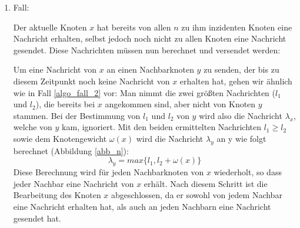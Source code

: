 \begin{enumerate}
		
	\item Fall:
	
		Der aktuelle Knoten $x$ hat bereits von allen $n$ zu ihm inzidenten Knoten eine Nachricht erhalten, selbst jedoch noch nicht zu allen Knoten eine Nachricht gesendet. Diese Nachrichten müssen nun berechnet und versendet werden:\label{labelAufUnterfall}
		
		
			
			
		
		Um eine Nachricht von $x$ an einen Nachbarknoten $y$ zu senden, der bis zu diesem Zeitpunkt noch keine Nachricht von $x$ erhalten hat, gehen wir ähnlich wie in Fall \ref{algo_fall_2} vor: Man nimmt die zwei größten Nachrichten ($l_{1}$ und $l_{2}$), die bereits bei $x$ angekommen sind, aber nicht von Knoten $y$ stammen. Bei der Bestimmung von $l_{1}$ und $l_{2}$ von $y$ wird also die Nachricht $\lambda_{x}$, welche von $y$ kam, ignoriert. Mit den beiden ermittelten Nachrichten $l_{1} \ge l_{2}$ sowie dem Knotengewicht $\omega(x)$ wird die Nachricht $\lambda_{y}$ an y wie folgt berechnet (Abbildung \ref{abb_n}):  $$\lambda_{y} = max\{l_{1},  l_{2} + \omega(x)\}$$
		Diese Berechnung wird für jeden Nachbarknoten von $x$ wiederholt, so dass jeder Nachbar eine Nachricht von $x$ erhält. Nach diesem Schritt ist die Bearbeitung des Knoten $x$ abgeschlossen, da er sowohl von jedem Nachbar eine Nachricht erhalten hat, als auch an jeden Nachbarn eine Nachricht gesendet hat.
		
		
		
	
		
		
\end{enumerate}

